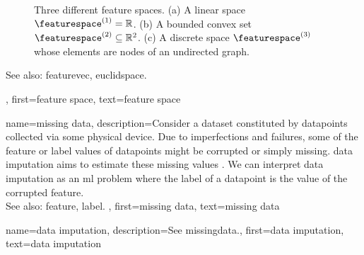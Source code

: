 {{\begin{figure}[H]
		\caption{Three different \gls{feature} spaces. (a) A linear space $\featurespace^{(1)} = \mathbb{R}$. (b) A 
		bounded \gls{convex} set $\featurespace^{(2)} \subseteq \mathbb{R}^{2}$. (c) A discrete space 
		$\featurespace^{(3)}$ whose elements are nodes of an undirected \gls{graph}. \label{fig_featurespace_dict}}
		\end{figure}
		See also: \gls{featurevec}, \gls{euclidspace}.},
	first={feature space},
	text={feature space}  
}


{name={missing data},
	description={Consider a \gls{dataset} constituted by \glspl{datapoint} collected via 
		some physical \gls{device}. Due to imperfections and failures, some of the \gls{feature} 
		or \gls{label} values of \glspl{datapoint} might be corrupted or simply missing. 
		\Gls{data} imputation aims to estimate these missing values \cite{Abayomi2008DiagnosticsFM}. 
		We can interpret \gls{data} imputation as an \gls{ml} problem where the \gls{label} of a \gls{datapoint} is 
		the value of the corrupted \gls{feature}.
				\\
		See also: \gls{feature}, \gls{label}. },
	first={missing data},
	text={missing data}  
}

{name={data imputation},
	description={See \gls{missingdata}.},
	first={data imputation},
	text={data imputation}  
}



